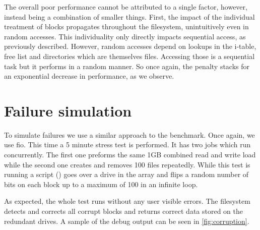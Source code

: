         The overall poor performance cannot be attributed to a single factor,
        however, instead being a combination of smaller things. First, the
        impact of the individual treatment of blocks propagates throughout the
        filesystem, unintuitively even in random accesses. This individuality
        only directly impacts sequential access, as previously described.
        However, random accesses depend on lookups in the i-table, free list
        and directories which are themselves files. Accessing those is a
        sequential task but it performs in a random manner. So once again, the
        penalty stacks for an exponential decrease in performance, as we
        observe.

    \section{Failure simulation}

        To simulate failures we use a similar approach to the benchmark. Once
        again, we use fio. This time a 5 minute stress test is performed. It
        has two jobs which run concurrently. The first one preforms the same
        1GB combined read and write load while the second one creates and
        removes 100 files repeatedly. While this test is running a script
        () goes over a drive in the array
        and flips a random number of bits on each block up to a maximum of 100
        in an infinite loop.

        As expected, the whole test runs without any user visible errors. The
        filesystem detects and corrects all corrupt blocks and returns correct
        data stored on the redundant drives. A sample of the debug output can
        be seen in \autoref{fig:corruption}.

